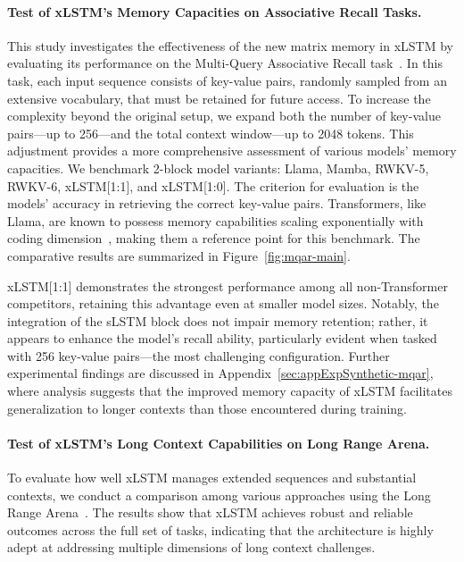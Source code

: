 \paragraph{Test of xLSTM's Memory Capacities on Associative Recall Tasks.} This study investigates the effectiveness of the new matrix memory in xLSTM by evaluating its performance on the Multi-Query Associative Recall task~\citep{Arora:23arxiv}. In this task, each input sequence consists of key-value pairs, randomly sampled from an extensive vocabulary, that must be retained for future access. To increase the complexity beyond the original setup, we expand both the number of key-value pairs—up to 256—and the total context window—up to 2048 tokens. This adjustment provides a more comprehensive assessment of various models’ memory capacities. We benchmark 2-block model variants: Llama, Mamba, RWKV-5, RWKV-6, xLSTM[1:1], and xLSTM[1:0]. The criterion for evaluation is the models' accuracy in retrieving the correct key-value pairs. Transformers, like Llama, are known to possess memory capabilities scaling exponentially with coding dimension~\citep{Ramsauer:21}, making them a reference point for this benchmark. The comparative results are summarized in Figure~\ref{fig:mqar-main}.

xLSTM[1:1] demonstrates the strongest performance among all non-Transformer competitors, retaining this advantage even at smaller model sizes. Notably, the integration of the sLSTM block does not impair memory retention; rather, it appears to enhance the model's recall ability, particularly evident when tasked with 256 key-value pairs—the most challenging configuration. Further experimental findings are discussed in Appendix~\ref{sec:appExpSynthetic-mqar}, where analysis suggests that the improved memory capacity of xLSTM facilitates generalization to longer contexts than those encountered during training.

\paragraph{Test of xLSTM's Long Context Capabilities on Long Range Arena.} To evaluate how well xLSTM manages extended sequences and substantial contexts, we conduct a comparison among various approaches using the Long Range Arena~\citep{Tay:21}. The results show that xLSTM achieves robust and reliable outcomes across the full set of tasks, indicating that the architecture is highly adept at addressing multiple dimensions of long context challenges.

